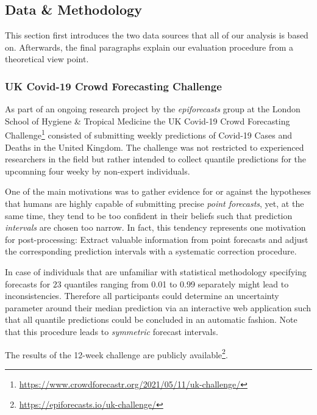 \documentclass[
]{article}
\DeclareRobustCommand{\href}[2]{#2\footnote{\url{#1}}}
\begin{document}
\hypertarget{data}{%
\subsection{Data \& Methodology}\label{data}}

This section first introduces the two data sources that all of our analysis is based on.
Afterwards, the final paragraphs explain our evaluation procedure from a theoretical view point.

\hypertarget{uk-covid-19-crowd-forecasting-challenge}{%
\subsubsection{UK Covid-19 Crowd Forecasting Challenge}\label{uk-covid-19-crowd-forecasting-challenge}}

As part of an ongoing research project by the \emph{epiforecasts} group at the London School of Hygiene \& Tropical Medicine the \href{https://www.crowdforecastr.org/2021/05/11/uk-challenge/}{UK Covid-19 Crowd Forecasting Challenge} consisted of submitting weekly predictions of Covid-19 Cases and Deaths in the United Kingdom.
The challenge was not restricted to experienced researchers in the field but rather intended to collect quantile predictions for the upcomning four weeky by non-expert individuals.

One of the main motivations was to gather evidence for or against the hypotheses that humans are highly capable of submitting precise \emph{point forecasts}, yet, at the same time, they tend to be too confident in their beliefs such that prediction \emph{intervals} are chosen too narrow.
In fact, this tendency represents one motivation for post-processing: Extract valuable information from point forecasts and adjust the corresponding prediction intervals with a systematic correction procedure.

In case of individuals that are unfamiliar with statistical methodology specifying forecasts for \(23\) quantiles ranging from 0.01 to 0.99 separately might lead to inconsistencies.
Therefore all participants could determine an uncertainty parameter around their median prediction via an interactive web application such that all quantile predictions could be concluded in an automatic fashion.
Note that this procedure leads to \emph{symmetric} forecast intervals.

The results of the 12-week challenge are \href{https://epiforecasts.io/uk-challenge/}{publicly available}.
\end{document}

